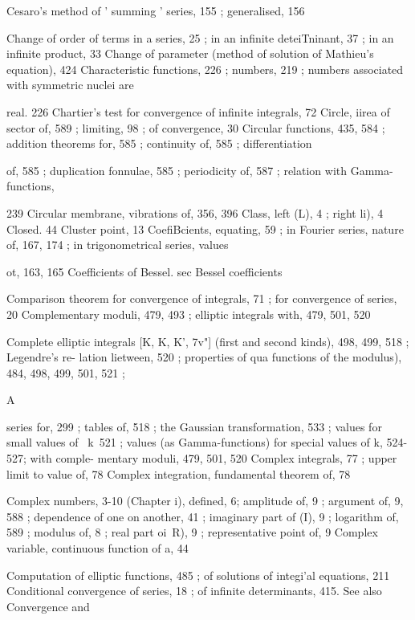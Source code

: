 Cesaro's method of ' summing ' series, 155 ; generalised, 156

Change of order of terms in a series, 25 ; in an infinite deteiTninant, 37 ; in an infinite product, 33
Change of parameter (method of solution of Mathieu's equation), 424
Characteristic functions, 226 ; numbers, 219 ; numbers associated with symmetric nuclei are

real. 226
Chartier's test for convergence of infinite integrals, 72
Circle, iirea of sector of, 589 ; limiting, 98 ; of convergence, 30
Circular functions, 435, 584 ; addition theorems for, 585 ; continuity of, 585 ; differentiation

of, 585 ; duplication fonnulae, 585 ; periodicity of, 587 ; relation with Gamma-functions,

239
Circular membrane, vibrations of, 356, 396
Class, left (L), 4 ; right  li), 4
Closed. 44
Cluster point, 13
CoefiBcients, equating, 59 ; in Fourier series, nature of, 167, 174 ; in trigonometrical series, values

ot, 163, 165
Coefficients of Bessel. sec Bessel coefficients

Comparison theorem for convergence of integrals, 71 ; for convergence of series, 20
Complementary moduli, 479, 493 ; elliptic integrals with, 479, 501, 520

Complete elliptic integrals [K, K, K', 7v"] (first and second kinds), 498, 499, 518 ; Legendre's re-
lation lietween, 520 ; properties of  qua functions of the modulus), 484, 498, 499, 501, 521 ;



 A



series for, 299 ; tables of, 518 ; the Gaussian transformation, 533 ; values for small values
of \ k\, 521 ; values (as Gamma-functions) for special values of k, 524-527; with comple-
mentary moduli, 479, 501, 520
Complex integrals, 77 ; upper limit to value of, 78
Complex integration, fundamental theorem of, 78

Complex numbers, 3-10 (Chapter i), defined, 6; amplitude of, 9 ; argument of, 9, 588 ; dependence
of one on another, 41 ; imaginary part of (I), 9 ; logarithm of, 589 ; modulus of, 8 ; real part
oi\ R), 9 ; representative point of, 9
Complex variable, continuous function of a, 44

Computation of elliptic functions, 485 ; of solutions of integi'al equations, 211
Conditional convergence of series, 18 ; of infinite determinants, 415. See also Convergence and

